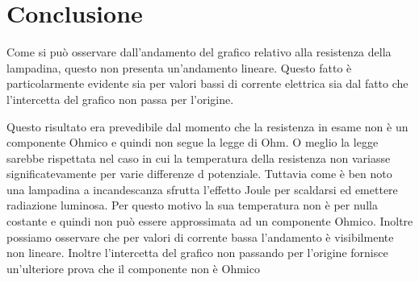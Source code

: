 \section*{Conclusione}

Come si può osservare dall'andamento del grafico relativo alla resistenza della lampadina, questo non presenta un'andamento lineare.
Questo fatto è particolarmente evidente sia per valori bassi di corrente elettrica sia dal fatto che l'intercetta del grafico non passa per l'origine.

Questo risultato era prevedibile dal momento che la resistenza in esame non è un componente Ohmico e quindi non segue la legge di Ohm.
O meglio la legge sarebbe rispettata nel caso in cui la temperatura della resistenza non variasse significatevamente per varie differenze d potenziale. Tuttavia come è ben noto una lampadina a incandescanza sfrutta l'effetto Joule per scaldarsi ed emettere radiazione luminosa. Per questo motivo la sua temperatura non è per nulla costante e quindi non può essere approssimata ad un componente Ohmico.
Inoltre possiamo osservare che per valori di corrente bassa l'andamento è visibilmente non lineare. Inoltre l'intercetta del grafico non passando per l'origine fornisce un'ulteriore prova che il componente non è Ohmico
